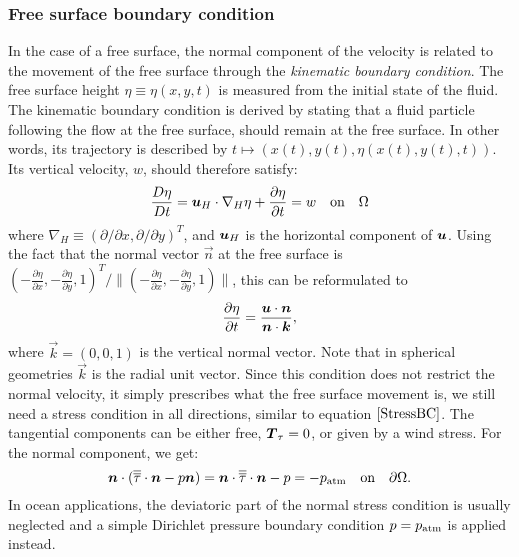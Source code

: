 \subsubsection{Free surface boundary condition}\label{sec:FS}
In the case of a free surface, the normal component of the velocity is related
to the movement of the free surface through the \emph{kinematic boundary
condition}. The free surface height $\eta\equiv\eta(x,y,t)$ is measured from 
the initial state of the fluid. The kinematic boundary condition is derived by
stating that a fluid particle following the flow at the free surface, should
remain at the free surface. In other words, its trajectory is described by
$t\mapsto (x(t), y(t),\eta(x(t),y(t),t))$. Its vertical velocity, $w$, should
therefore satisfy:
\begin{equation} \label{eq:kinematicbc1}
  \frac{D\eta}{Dt}={\mbox{\boldmath$u$}}_H \cdot\nabla_H \eta +
  \frac{\partial\eta}{\partial t} = w \quad \textrm{on}\quad \Omega
\end{equation}
where $\nabla_H\equiv(\partial/\partial x,\partial/\partial y)^T$, and
${\mbox{\boldmath$u$}}_H$ is the horizontal component of ${\mbox{\boldmath$u$}}$.
Using the fact that the normal vector $\vec n$ at the free surface is
$(-\frac{\partial \eta}{\partial x},-\frac{\partial \eta}{\partial y}, 1)^T/
\|(-\frac{\partial \eta}{\partial x},-\frac{\partial \eta}{\partial y}, 1)\|$,
this can be reformulated to
\begin{equation}\label{freesurf3}
\frac{\partial \eta}{\partial t}=\frac{{\mbox{\boldmath$u$}} \cdot {\mbox{\boldmath$n$}}}{{\mbox{\boldmath$n$}} \cdot {\mbox{\boldmath$k$}}},
\end{equation}
where $\vec k=(0,0,1)$ is the vertical normal vector. Note that in spherical
geometries $\vec k$ is the radial unit vector. Since this condition does not
restrict the normal velocity, it simply
prescribes what the free surface movement is, we still need a stress condition
in all directions, similar to equation $\eqref{StressBC}$. The tangential
components can be either free, ${\mbox{\boldmath$T$}}_\tau=0$, or given by a wind stress. For the
normal component, we get:
\begin{equation}
  {\mbox{\boldmath$n$}}\cdot(\overline{\overline{\tau}}\cdot{\mbox{\boldmath$n$}} - p{\mbox{\boldmath$n$}}) = {\mbox{\boldmath$n$}}\cdot\overline{\overline{\tau}}\cdot{\mbox{\boldmath$n$}} - p =
  -p_{\text{atm}} \quad \textrm{on}\quad \partial\Omega.
  \label{NormalStressBC}
\end{equation}
In ocean applications, the deviatoric part of the normal stress condition is
usually neglected and a simple Dirichlet pressure boundary condition $p=p_{\text{atm}}$
is applied instead.


